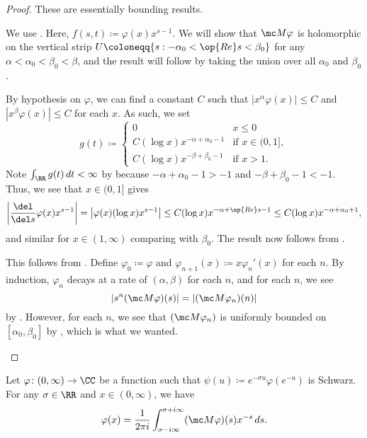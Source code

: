 \documentclass[../notes.tex]{subfiles}
\begin{document}
\begin{proof}
	These are essentially bounding results.
	\begin{listalph}
		\item We use . Here, $f(s,t)\coloneqq\varphi(x)x^{s-1}$. We will show that $\mc M\varphi$ is holomorphic on the vertical strip $U\coloneqq\{s:-\alpha_0<\op{Re}s<\beta_0\}$ for any $\alpha<\alpha_0<\beta_0<\beta$, and the result will follow by taking the union over all $\alpha_0$ and $\beta_0$.

		By hypothesis on $\varphi$, we can find a constant $C$ such that $\left|x^\alpha\varphi(x)\right|\le C$ and $\left|x^\beta\varphi(x)\right|\le C$ for each $x$. As such, we set
		\[g(t)\coloneqq\begin{cases}
			0 & x\le0 \\
			C(\log x)x^{-\alpha+\alpha_0-1} & \text{if }x\in(0,1], \\
			C(\log x)x^{-\beta+\beta_0-1} & \text{if }x>1.
		\end{cases}\]
		Note $\int_\RR g(t)\,dt<\infty$ by  because $-\alpha+\alpha_0-1>-1$ and $-\beta+\beta_0-1<-1$. Thus, we see that $x\in(0,1]$ gives
		\[\left|\frac{\del}{\del s}\varphi(x)x^{s-1}\right|=\left|\varphi(x)(\log x)x^{s-1}\right|\le C(\log x)x^{-\alpha+\op{Re}s-1}\le C(\log x)x^{-\alpha+\alpha_0+1},\]
		and similar for $x\in(1,\infty)$ comparing with $\beta_0$. The result now follows from .
		\item This follows from . Define $\varphi_0\coloneqq\varphi$ and $\varphi_{n+1}(x)\coloneqq x\varphi_n'(x)$ for each $n$. By induction, $\varphi_n$ decays at a rate of $(\alpha,\beta)$ for each $n$, and for each $n$, we see
		\[\left|s^n(\mc M\varphi)(s)\right|=\left|(\mc M\varphi_n)(n)\right|\]
		by . However, for each $n$, we see that $(\mc M\varphi_n)$ is uniformly bounded on $[\alpha_0,\beta_0]$ by , which is what we wanted.
		\qedhere
	\end{listalph}
\end{proof}
\begin{theorem} \label{thm:inv-mellin}
	Let $\varphi\colon(0,\infty)\to\CC$ be a function such that $\psi(u)\coloneqq e^{-\sigma u}\varphi\left(e^{-u}\right)$ is Schwarz. For any $\sigma\in\RR$ and $x\in(0,\infty)$, we have
	\[\varphi(x)=\frac1{2\pi i}\int_{\sigma-i\infty}^{\sigma+i\infty}(\mc M\varphi)(s)x^{-s}\,ds.\]
\end{theorem}
\end{document}
